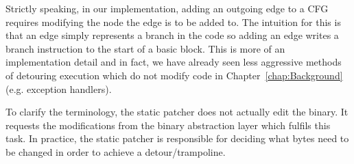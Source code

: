 Strictly speaking, in our implementation, adding an outgoing edge to a CFG requires modifying the node the edge is to be added to. The intuition for this is that an edge simply represents a branch in the code so adding an edge writes a branch instruction to the start of a basic block. This is more of an implementation detail and in fact, we have already seen less aggressive methods of detouring execution which do not modify code in Chapter~\ref{chap:Background} (e.g. exception handlers).

To clarify the terminology, the static patcher does not actually edit the binary. It requests the modifications from the binary abstraction layer which fulfils this task. In practice, the static patcher is responsible for deciding what bytes need to be changed in order to achieve a detour/trampoline.